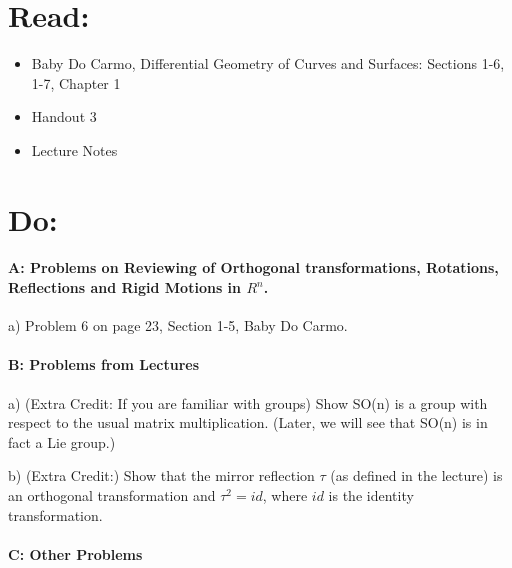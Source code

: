 \documentclass[12pt]{article}
\title{\rightline {\Huge {Due: Wed. Sept 20}}}
\author{\LARGE {HMC\quad Math 142 \quad Fall 2017} 
\\ {Prof. Gu}  
\\ {\LARGE Problem Set 3}}
\date{Start this assignment before Sunday night!}
\begin{document}
\maketitle

\section*{ Read: } 

\begin{itemize}
\item{Baby Do Carmo, Differential Geometry
    of Curves and Surfaces:  
Sections 1-6, 1-7, Chapter 1}
\item{Handout 3}
\item{Lecture Notes}
\end{itemize}

\section*{ Do: }
\paragraph{A: Problems on Reviewing of Orthogonal transformations, 
Rotations, Reflections and Rigid Motions
  in $R^n$.}
\begin{itemize}
 
{\item a) Problem 6 on page 23, Section 1-5, Baby Do Carmo.}
\end{itemize}

\medskip
\paragraph{B: Problems from Lectures}

\begin{itemize}
{\item a) (Extra Credit: If you are familiar with groups) Show SO(n) is a group with respect to the usual matrix 
multiplication. (Later, we will see that SO(n) is in fact a Lie group.)}
{\item b) (Extra Credit:) Show that the mirror reflection $\tau$ (as defined in the 
lecture) is an orthogonal transformation and $\tau^2 = id$, where 
$id$ is the identity transformation. }
\end{itemize}


\paragraph{C: Other Problems}
\end{document}
